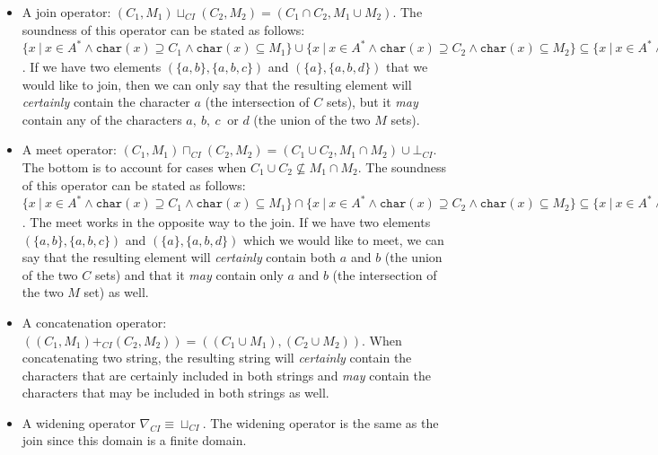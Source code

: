 \documentclass[10pt]{report}
\begin{document}
\begin{itemize}
	\item A join operator: $(C_{1}, M_{1}) \sqcup_{CI} (C_{2}, M_{2}) = (C_{1} \cap C_{2}, M_{1} \cup M_{2})$. The soundness of this operator can be stated as follows: \\ $ \lbrace x\ \vert\ x \in A^{*} \wedge \mathtt{char}(x) \supseteq C_{1} \wedge \mathtt{char}(x) \subseteq M_{1} \rbrace \cup \lbrace x\ \vert\ x \in A^{*} \wedge \mathtt{char}(x) \supseteq C_{2} \wedge \mathtt{char}(x) \subseteq M_{2} \rbrace \subseteq  \lbrace x\ \vert\ x \in A^{*} \wedge \mathtt{char}(x) \supseteq C_{1}\ \cap\ C_{2}\ \wedge\ \mathtt{char}(x) \subseteq M_{1} \cup M_{2} \rbrace \Longleftrightarrow \gamma_{CI}((C_{1}, M_{1})) \cup \gamma_{CI}((C_{2}, M_{2})) \subseteq \gamma_{CI}((C_{1}, M_{1}) \sqcup_{CI} (C_{2}, M_{2}))$. If we have two elements $ (\lbrace a, b \rbrace, \lbrace a, b, c \rbrace) $ and $ (\lbrace a \rbrace, \lbrace a, b, d \rbrace) $ that we would like to join, then we can only say that the resulting element will \textit{certainly} contain the character $ a $ (the intersection of $ C $ sets), but it \textit{may} contain any of the characters $ a,\ b,\ c\ $ or $ d $ (the union of the two $ M $ sets). 
	
	 
	\item A meet operator: $(C_{1}, M_{1}) \sqcap_{CI} (C_{2}, M_{2}) = (C_{1} \cup C_{2}, M_{1} \cap M_{2}) \cup \bot_{CI}$. The bottom is to account for cases when $C_{1} \cup C_{2} \not\subseteq M_{1} \cap M_{2}$. The soundness of this operator can be stated as follows: \\$ \lbrace x\ \vert\ x \in A^{*} \wedge \mathtt{char}(x) \supseteq C_{1} \wedge \mathtt{char}(x) \subseteq M_{1} \rbrace \cap \lbrace x\ \vert\ x \in A^{*} \wedge \mathtt{char}(x) \supseteq C_{2} \wedge \mathtt{char}(x) \subseteq M_{2} \rbrace \subseteq  \lbrace x\ \vert\ x \in A^{*} \wedge \mathtt{char}(x) \supseteq C_{1} \cup C_{2} \wedge \mathtt{char}(x) \subseteq M_{1} \cap M_{2} \rbrace \Longleftrightarrow \gamma_{CI}((C_{1}, M_{1})) \cap \gamma_{CI}((C_{2}, M_{2})) \subseteq \gamma_{CI}((C_{1}, M_{1}) \sqcap_{CI} (C_{2}, M_{2}))$. The meet works in the opposite way to the join. If we have two elements $ (\lbrace a, b \rbrace, \lbrace a, b, c \rbrace) $ and $ (\lbrace a \rbrace, \lbrace a, b, d \rbrace) $ which we would like to meet, we can say that the resulting element will \textit{certainly} contain both $ a $ and $ b $ (the union of the two $ C $ sets) and that it \textit{may} contain only $ a $ and $ b $ (the intersection of the two $ M $ set) as well.  
 	
	\item A concatenation operator: $ ((C_{1}, M_{1}) +_{CI} (C_{2}, M_{2})) = ((C_{1} \cup M_{1}),(C_{2} \cup M_{2}))$. When concatenating two string, the resulting string will \textit{certainly} contain the characters that are certainly included in both strings and \textit{may} contain the characters that may be included in both strings as well. 
	\item A widening operator $\nabla_{CI} \equiv \sqcup_{CI}.$ The widening operator is the same as the join since this domain is a finite domain. 
	
\end{itemize}
\end{document}
